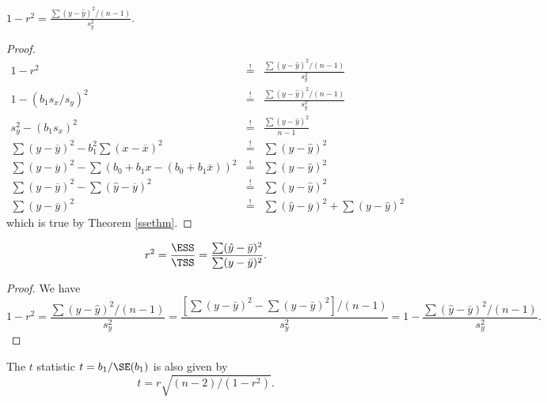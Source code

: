 \begin{thm}\label{aid}
$1-r^2= \frac{\sum(y-\hat y)^2/(n-1)}{s_y^2}$.
\end{thm}
\begin{proof}
	\begin{eqnarray*}
		1-r^2 												&\overset{!}{=}& \frac{\sum(y-\hat y)^2/(n-1)}{s_y^2}\\
		1-(b_1s_x/s_y)^2 										&\overset{!}{=}& \frac{\sum(y-\hat y)^2/(n-1)}{s_y^2}\\
		s_y^2-(b_1s_x)^2 										&\overset{!}{=}& \frac{\sum(y-\hat y)^2}{n-1}\\
		\sum(y-\overline y)^2-b_1^2 \sum (x-\overline x)^2 				&\overset{!}{=}& \sum(y-\hat y)^2\\
		\sum(y-\overline y)^2 - \sum (b_0+b_1x-(b_0+b_1\overline x))^2 	&\overset{!}{=}& \sum(y-\hat y)^2\\
		\sum(y-\overline y)^2 - \sum (\hat y-\overline y)^2 				&\overset{!}{=}& \sum(y-\hat y)^2\\
		\sum(y-\overline y)^2										&\overset{!}{=}& \sum (\hat y-\overline y)^2 + \sum(y-\hat y)^2
	\end{eqnarray*}
	which is true by Theorem \ref{ssethm}.
\end{proof}

\begin{thm}\label{miao-hu}
\[
r^2=\frac{\ESS}{\TSS}=\frac{\sum (\hat y-\bar y)^2}{\sum (y-\bar y)^2}.
\]
\end{thm}
\begin{proof}
We have
\[
	1-r^2= \frac{\sum(y-\hat y)^2/(n-1)}{s_y^2} = \frac{[\sum(y-\bar y)^2-\sum (\hat y-\bar y)^2]/(n-1)}{s_y^2} = 1-\frac{\sum (\hat y-\bar y)^2/(n-1)}{s_y^2}.
\]
\end{proof}
 
\begin{thm}\label{https://www.andrews.edu/}
The $t$ statistic $t=b_1/\SE(b_1)$ is also given by
	\[
		t=r\sqrt{(n-2)/(1-r^2)}.
	\]
\end{thm}

